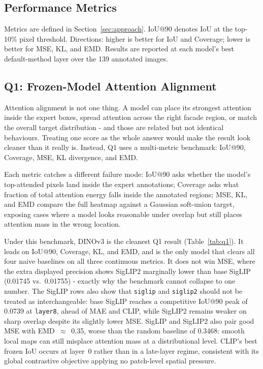 \documentclass[lineno,pdflatex,sn-mathphys-num]{sn-jnl}%
\theoremstyle{thmstyleone}%
\theoremstyle{thmstyletwo}%
\theoremstyle{thmstylethree}%
\begin{document}
\subsection{Performance Metrics}

Metrics are defined in Section~\ref{sec:approach}. IoU@90 denotes IoU at the
top-10\% pixel threshold. Directions: higher is better for IoU and Coverage;
lower is better for MSE, KL, and EMD. Results are reported at each model's
best default-method layer over the 139 annotated images.

\subsection{Q1: Frozen-Model Attention Alignment}

Attention alignment is not one thing. A model can place its strongest attention
inside the expert boxes, spread attention across the right facade region, or
match the overall target distribution - and those are related but not identical
behaviours. Treating one score as the whole answer would make the result look
cleaner than it really is. Instead, Q1 uses a multi-metric benchmark: IoU@90,
Coverage, MSE, KL divergence, and EMD.

Each metric catches a different failure mode: IoU@90 asks whether the model's
top-attended pixels land inside the expert annotations; Coverage asks what
fraction of total attention energy falls inside the annotated regions; MSE, KL,
and EMD compare the full heatmap against a Gaussian soft-union target, exposing
cases where a model looks reasonable under overlap but still places attention
mass in the wrong location.

Under this benchmark, DINOv3 is the cleanest Q1 result (Table~\ref{tab:q1}).
It leads on IoU@90, Coverage, KL, and EMD, and is the only model that clears
all four naive baselines on all three continuous metrics. It does not win MSE,
where the extra displayed precision shows SigLIP2 marginally lower than base
SigLIP (0.01745 vs.\ 0.01755) - exactly why the benchmark cannot collapse
to one number. The SigLIP rows also show that \texttt{siglip} and
\texttt{siglip2} should not be treated as interchangeable: base SigLIP
reaches a competitive IoU@90 peak of 0.0739 at \texttt{layer8}, ahead of MAE
and CLIP, while SigLIP2 remains weaker on sharp overlap despite its slightly
lower MSE. SigLIP and SigLIP2 also pair good MSE with EMD~$\approx$~0.35,
worse than the random baseline of 0.3468: smooth local maps can still
misplace attention mass at a distributional level. CLIP's best frozen IoU
occurs at layer~0 rather than in a late-layer regime, consistent with its
global contrastive objective applying no patch-level spatial pressure.
\end{document}
